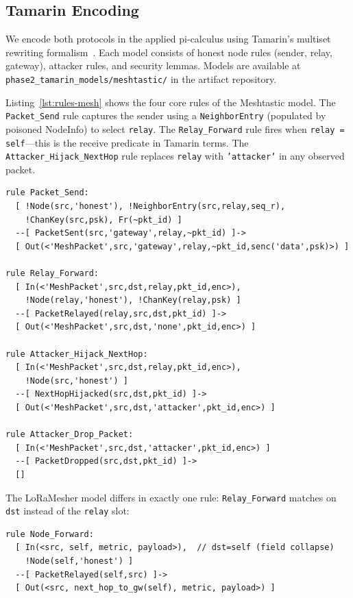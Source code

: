\documentclass[journal]{IEEEtran}
\begin{document}
\subsection{Tamarin Encoding}

We encode both protocols in the applied pi-calculus using Tamarin's
multiset rewriting formalism~\cite{tamarin}. Each model consists of
honest node rules (sender, relay, gateway), attacker rules, and
security lemmas. Models are available at
\texttt{phase2\_tamarin\_models/meshtastic/} in the artifact repository.

Listing~\ref{lst:rules-mesh} shows the four core rules of the
Meshtastic model. The \texttt{Packet\_Send} rule captures the sender
using a \texttt{NeighborEntry} (populated by poisoned NodeInfo) to
select \texttt{relay}. The \texttt{Relay\_Forward} rule fires when
\texttt{relay = self}---this is the receive predicate in Tamarin terms.
The \texttt{Attacker\_Hijack\_NextHop} rule replaces \texttt{relay}
with \texttt{'attacker'} in any observed packet.

\begin{lstlisting}[label=lst:rules-mesh,
  caption={Meshtastic Tamarin model: core rules (meshtastic\_routing.spthy)}]
rule Packet_Send:
  [ !Node(src,'honest'), !NeighborEntry(src,relay,seq_r),
    !ChanKey(src,psk), Fr(~pkt_id) ]
  --[ PacketSent(src,'gateway',relay,~pkt_id) ]->
  [ Out(<'MeshPacket',src,'gateway',relay,~pkt_id,senc('data',psk)>) ]

rule Relay_Forward:
  [ In(<'MeshPacket',src,dst,relay,pkt_id,enc>),
    !Node(relay,'honest'), !ChanKey(relay,psk) ]
  --[ PacketRelayed(relay,src,dst,pkt_id) ]->
  [ Out(<'MeshPacket',src,dst,'none',pkt_id,enc>) ]

rule Attacker_Hijack_NextHop:
  [ In(<'MeshPacket',src,dst,relay,pkt_id,enc>),
    !Node(src,'honest') ]
  --[ NextHopHijacked(src,dst,pkt_id) ]->
  [ Out(<'MeshPacket',src,dst,'attacker',pkt_id,enc>) ]

rule Attacker_Drop_Packet:
  [ In(<'MeshPacket',src,dst,'attacker',pkt_id,enc>) ]
  --[ PacketDropped(src,dst,pkt_id) ]->
  []
\end{lstlisting}

The LoRaMesher model differs in exactly one rule: \texttt{Relay\_Forward}
matches on \texttt{dst} instead of the \texttt{relay} slot:

\begin{lstlisting}[caption={LoRaMesher Tamarin model: relay rule (baseline\_lora\_dv.spthy)}]
rule Node_Forward:
  [ In(<src, self, metric, payload>),  // dst=self (field collapse)
    !Node(self,'honest') ]
  --[ PacketRelayed(self,src) ]->
  [ Out(<src, next_hop_to_gw(self), metric, payload>) ]
\end{lstlisting}
\end{document}
